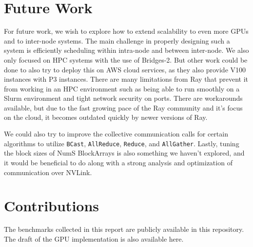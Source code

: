 \documentclass{article}
\begin{document}
\section{Future Work}
For future work, we wish to explore how to extend scalability to even more GPUs and to inter-node systems. The main challenge in properly designing such a system is efficiently scheduling within intra-node and between inter-node. We also only focused on HPC systems with the use of Bridges-2. But other work could be done to also try to deploy this on AWS cloud services, as they also provide V100 instances with P3 instances. There are many limitations from Ray that prevent it from working in an HPC environment such as being able to run smoothly on a Slurm environment and tight network security on ports. There are workarounds available, but due to the fast growing pace of the Ray community and it's focus on the cloud, it becomes outdated quickly by newer versions of Ray.

We could also try to improve the collective communication calls for certain algorithms to utilize \verb|BCast|, \verb|AllReduce|, \verb|Reduce|, and \verb|AllGather|. Lastly, tuning the block sizes of NumS BlockArrays is also something we haven't explored, and it would be beneficial to do along with a strong analysis and optimization of communication over NVLink.

\section{Contributions}
The benchmarks collected in this report are publicly available in this repository. \cite{benchmarks} The draft of the GPU implementation is also available here. \cite{nums-pr}



\end{document}
